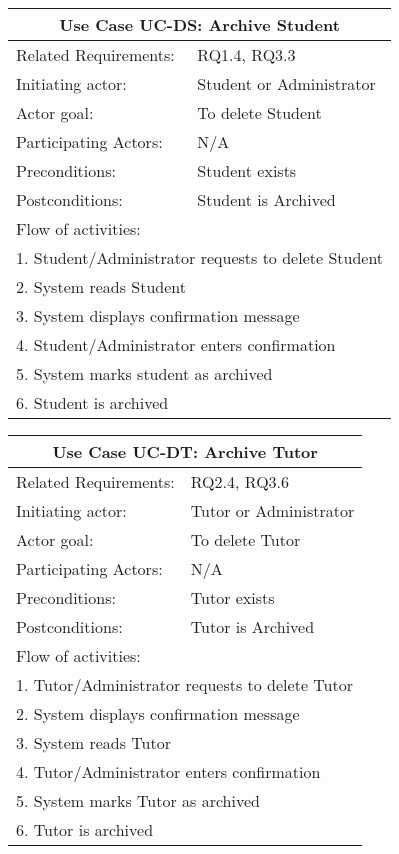 \documentclass[12pt]{article}
\begin{document}
{		%
		\begin{tabular}{| l | p{10cm}| }
			\hline\multicolumn{2}{|c|}{ \textbf{Use Case UC-DS: Archive Student}} \\ \hline
			Related Requirements: & RQ1.4, RQ3.3 \\ \hline
			Initiating actor: & Student or Administrator \\ \hline
			Actor goal: & To delete Student\\ \hline
			Participating Actors: & N/A\\ \hline
			Preconditions: &Student exists\\ \hline
			Postconditions: & Student is Archived\\ \hline
			\multicolumn{2}{|l|}{Flow of activities:}\\ \hline
			\multicolumn{2}{|p{15cm}|}{1. Student/Administrator requests to delete Student}\\
			\multicolumn{2}{|p{15cm}|}{2. System reads Student}\\			
			\multicolumn{2}{|p{15cm}|}{3. System displays confirmation message}\\
			\multicolumn{2}{|p{15cm}|}{4. Student/Administrator enters confirmation}	\\		
			\multicolumn{2}{|p{15cm}|}{5. System marks student as archived}\\
			\multicolumn{2}{|l|}{6. Student is archived}	
			\\ \hline		
		\end{tabular}



		\begin{tabular}{| l | p{10cm}| }
			\hline\multicolumn{2}{|c|}{ \textbf{Use Case UC-DT: Archive Tutor}} \\ \hline
			Related Requirements: & RQ2.4, RQ3.6 \\ \hline
			Initiating actor: & Tutor or Administrator \\ \hline
			Actor goal: & To delete Tutor\\ \hline
			Participating Actors: & N/A\\ \hline
			Preconditions:& Tutor exists\\ \hline
			Postconditions: & Tutor is Archived\\ \hline
			\multicolumn{2}{|l|}{Flow of activities:}\\ \hline
			\multicolumn{2}{|p{15cm}|}{1. Tutor/Administrator requests to delete Tutor}\\
			\multicolumn{2}{|p{15cm}|}{2. System displays confirmation message}\\
			\multicolumn{2}{|p{15cm}|}{3. System reads Tutor}\\
			\multicolumn{2}{|p{15cm}|}{4. Tutor/Administrator enters confirmation}	\\		
			\multicolumn{2}{|p{15cm}|}{5. System marks Tutor as archived }\\
			\multicolumn{2}{|l|}{6. Tutor is archived}	
			\\ \hline		
		\end{tabular}



}
\end{document}
